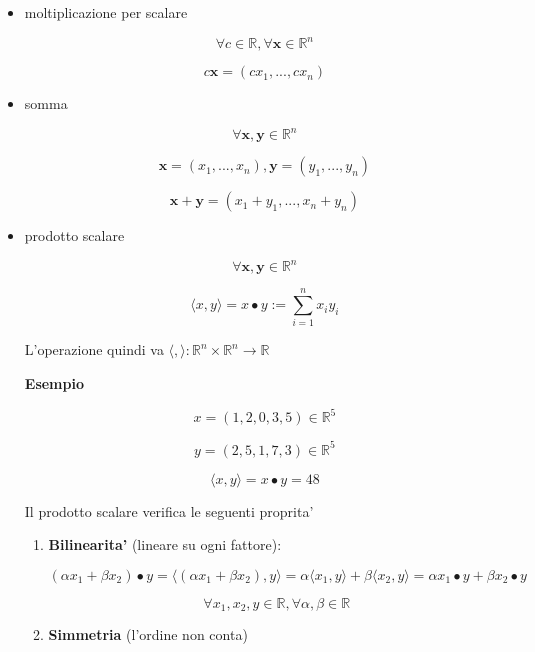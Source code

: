 \documentclass[11pt]{article}
\begin{document}
\begin{itemize}
    \item moltiplicazione per scalare

        \[
            \forall c \in \mathbb{R}, \forall \textbf{x} \in \mathbb{R}^{n}
        \]

        \[
            c \textbf{x} = (cx_1,...,cx_n)
        \]

    \item somma

        \[
            \forall \textbf{x}, \textbf{y}  \in \mathbb{R}^{n}
        \]

        \[
       \textbf{x}  =(x_1,...,x_n), \textbf{y}  = (y_1,...,y_n)
        \]

        \[
            \textbf{x}+ \textbf{y} = (x_1+y_1,...,x_n+y_n)
        \]

    \item prodotto scalare

        \[
            \forall \textbf{x} ,\textbf{y} \in \mathbb{R}^{n}
        \]

        \[
            \langle x,y \rangle  = x \bullet y := \sum^{n}_{i=1} x_i y_i
        \]

        L'operazione quindi va $\langle , \rangle : \mathbb{R}^{n} \times \mathbb{R}^{n} \rightarrow \mathbb{R}$

        \textbf{Esempio} 

        \[
            x=(1,2,0,3,5) \in \mathbb{R}^{5}
        \]

        \[
            y=(2,5,1,7,3) \in \mathbb{R}^{5}
        \]

        \[
            \langle x,y \rangle  = x \bullet y = 48
        \]

        Il prodotto scalare verifica le seguenti proprita'

        \begin{enumerate}
            \item \textbf{Bilinearita'} (lineare su ogni fattore):

                \[
                    (\alpha x_1 + \beta x_2) \bullet y = \langle (\alpha x_1 + \beta x_2), y \rangle  = \alpha \langle x_1,y \rangle+ \beta \langle x_2,y \rangle = \alpha x_1 \bullet y + \beta x_2 \bullet y
                \]

                \[
                    \forall x_1,x_2,y \in \mathbb{R}, \forall \alpha, \beta \in \mathbb{R}
                \]

            \item \textbf{Simmetria} (l'ordine non conta)


\end{enumerate}
\end{itemize}
\end{document}
